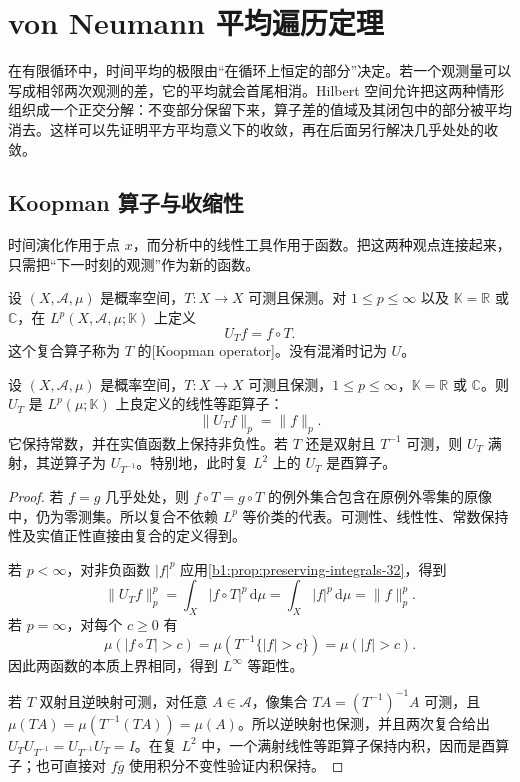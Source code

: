 \section{von Neumann 平均遍历定理}
\label{b1:sec:3202}

在有限循环中，时间平均的极限由“在循环上恒定的部分”决定。若一个观测量可以写成相邻两次观测的差，它的平均就会首尾相消。Hilbert 空间允许把这两种情形组织成一个正交分解：不变部分保留下来，算子差的值域及其闭包中的部分被平均消去。这样可以先证明平方平均意义下的收敛，再在后面另行解决几乎处处的收敛。

\subsection{Koopman 算子与收缩性}
\label{b1:subsec:320201}

时间演化作用于点 \(x\)，而分析中的线性工具作用于函数。把这两种观点连接起来，只需把“下一时刻的观测”作为新的函数。

\begin{definition}\label{b1:def:koopman-32}
设 \((X,\mathcal A,\mu)\) 是概率空间，\(T\colon X\rightarrow X\) 可测且保测。对 \(1\leq p\leq\infty\) 以及 \(\mathbb K=\mathbb R\) 或 \(\mathbb C\)，在 \(L^p(X,\mathcal A,\mu;\mathbb K)\) 上定义
\[
 U_Tf=f\circ T.
\]
这个复合算子称为 \(T\) 的[Koopman operator]。没有混淆时记为 \(U\)。
\end{definition}

\begin{proposition}\label{b1:prop:koopman-32}
设 \((X,\mathcal A,\mu)\) 是概率空间，\(T\colon X\rightarrow X\) 可测且保测，\(1\leq p\leq\infty\)，\(\mathbb K=\mathbb R\) 或 \(\mathbb C\)。则 \(U_T\) 是 \(L^p(\mu;\mathbb K)\) 上良定义的线性等距算子：
\[
 \|U_Tf\|_p=\|f\|_p.
\]
它保持常数，并在实值函数上保持非负性。若 \(T\) 还是双射且 \(T^{-1}\) 可测，则 \(U_T\) 满射，其逆算子为 \(U_{T^{-1}}\)。特别地，此时复 \(L^2\) 上的 \(U_T\) 是酉算子。
\end{proposition}
\begin{proof}
若 \(f=g\) 几乎处处，则 \(f\circ T=g\circ T\) 的例外集合包含在原例外零集的原像中，仍为零测集。所以复合不依赖 \(L^p\) 等价类的代表。可测性、线性性、常数保持性及实值正性直接由复合的定义得到。

若 \(p<\infty\)，对非负函数 \(|f|^p\) 应用\cref{b1:prop:preserving-integrals-32}，得到
\[
 \|U_Tf\|_p^p=\int_X |f\circ T|^p\,\mathrm d\mu
 =\int_X |f|^p\,\mathrm d\mu=\|f\|_p^p.
\]
若 \(p=\infty\)，对每个 \(c\geq0\) 有
\[
 \mu(|f\circ T|>c)=\mu(T^{-1}\{|f|>c\})=\mu(|f|>c).
\]
因此两函数的本质上界相同，得到 \(L^\infty\) 等距性。

若 \(T\) 双射且逆映射可测，对任意 \(A\in\mathcal A\)，像集合 \(TA=(T^{-1})^{-1}A\) 可测，且
\(\mu(TA)=\mu(T^{-1}(TA))=\mu(A)\)。所以逆映射也保测，并且两次复合给出
\(U_TU_{T^{-1}}=U_{T^{-1}}U_T=I\)。在复 \(L^2\) 中，一个满射线性等距算子保持内积，因而是酉算子；也可直接对 \(f\overline g\) 使用积分不变性验证内积保持。
\end{proof}

